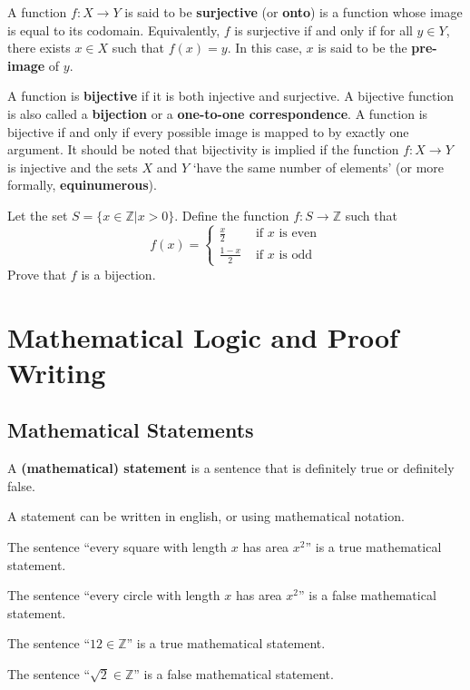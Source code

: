 A function $f: X \to Y$ is said to be \textbf{surjective} (or \textbf{onto}) is a function whose image is equal to its codomain. Equivalently, $f$ is surjective if and only if for all $y \in Y$, there exists $x \in X$ such that $f(x) = y$. In this case, $x$ is said to be the \textbf{pre-image} of $y$.

A function is \textbf{bijective} if it is both injective and surjective. A bijective function is also called a \textbf{bijection} or a \textbf{one-to-one correspondence}. A function is bijective if and only if every possible image is mapped to by exactly one argument. It should be noted that bijectivity is implied if the function $f: X \to Y$ is injective and the sets $X$ and $Y$ `have the same number of elements' (or more formally, \textbf{equinumerous}).

\begin{exercise}
    Let the set $S = \{x \in \mathbb{Z} \vert x > 0\}$. Define the function $f: S \to \mathbb{Z}$ such that
    \[
        f(x) = \begin{cases}
            \frac{x}{2} & \text{ if } x \text{ is even}\\
            \frac{1-x}{2} & \text{ if } x \text{ is odd} 
        \end{cases}
    \]
    Prove that $f$ is a bijection.
\end{exercise}

\chapter{Mathematical Logic and Proof Writing}
\section{Mathematical Statements}
\begin{definition}
    A \textbf{(mathematical) statement} is a sentence that is definitely true or definitely false.
\end{definition}
\begin{remark}
    A statement can be written in english, or using mathematical notation.
\end{remark}
\begin{example}
    The sentence ``every square with length $x$ has area $x^2$'' is a true mathematical statement.
\end{example}
\begin{example}
    The sentence ``every circle with length $x$ has area $x^2$'' is a false mathematical statement.
\end{example}
\begin{example}
    The sentence ``$12 \in \mathbb{Z}$'' is a true mathematical statement.
\end{example}
\begin{example}
    The sentence ``$\sqrt2 \in \mathbb{Z}$'' is a false mathematical statement.
\end{example}

